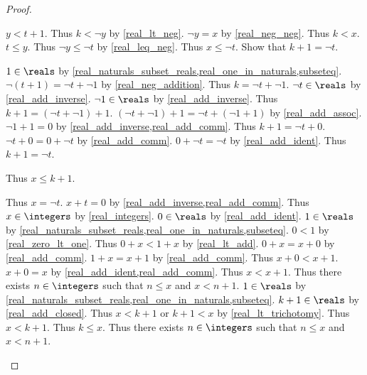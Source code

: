 \begin{proof}
\begin{byCase}
        $y < t + 1$.
        Thus $k < \neg{y}$ by \cref{real_lt_neg}.
        $\neg{y} = x$ by \cref{real_neg_neg}.
        Thus $k < x$.
        $t \leq y$.
        Thus $\neg{y} \leq \neg{t}$ by \cref{real_leq_neg}.
        Thus $x \leq \neg{t}$.
        Show that $k + 1 = \neg{t}$.
        \begin{subproof}
            $1\in\reals$ by \cref{real_naturals_subset_reals,real_one_in_naturals,subseteq}.
            $\neg{(t + 1)} = \neg{t} + \neg{1}$ by \cref{real_neg_addition}.
            Thus $k = \neg{t} + \neg{1}$.
            $\neg{t}\in\reals$ by \cref{real_add_inverse}.
            $\neg{1}\in\reals$ by \cref{real_add_inverse}.
            Thus $k + 1 = (\neg{t} + \neg{1}) + 1$.
            $(\neg{t} + \neg{1}) + 1 = \neg{t} + (\neg{1} + 1)$ by \cref{real_add_assoc}.
            $\neg{1} + 1 = 0$ by \cref{real_add_inverse,real_add_comm}.
            Thus $k + 1 = \neg{t} + 0$.
            $\neg{t} + 0 = 0 + \neg{t}$ by \cref{real_add_comm}.
            $0 + \neg{t} = \neg{t}$ by \cref{real_add_ident}.
            Thus $k + 1 = \neg{t}$.
        \end{subproof}
        Thus $x \leq k + 1$.
        \begin{byCase}
            Thus $x = \neg{t}$.
            $x + t = 0$ by \cref{real_add_inverse,real_add_comm}.
            Thus $x\in\integers$ by \cref{real_integers}.
            $0\in\reals$ by \cref{real_add_ident}.
            $1\in\reals$ by \cref{real_naturals_subset_reals,real_one_in_naturals,subseteq}.
            $0 < 1$ by \cref{real_zero_lt_one}.
            Thus $0 + x < 1 + x$ by \cref{real_lt_add}.
            $0 + x = x + 0$ by \cref{real_add_comm}.
            $1 + x = x + 1$ by \cref{real_add_comm}.
            Thus $x + 0 < x + 1$.
            $x + 0 = x$ by \cref{real_add_ident,real_add_comm}.
            Thus $x < x + 1$.
            Thus there exists $n\in\integers$ such that $n \leq x$ and $x < n + 1$.
            $1\in\reals$ by \cref{real_naturals_subset_reals,real_one_in_naturals,subseteq}.
            $k + 1\in\reals$ by \cref{real_add_closed}.
            Thus $x < k + 1$ or $k + 1 < x$ by \cref{real_lt_trichotomy}.
            Thus $x < k + 1$.
            Thus $k \leq x$.
            Thus there exists $n\in\integers$ such that $n \leq x$ and $x < n + 1$.
        \end{byCase}
    \end{byCase}
\end{proof}
  
